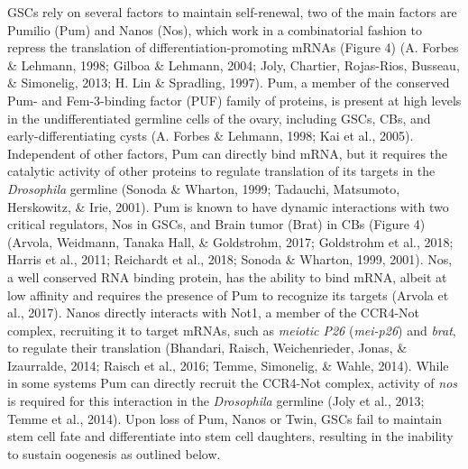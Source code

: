 \documentclass[12pt,oneside]{reedthesis}
\begin{document}
GSCs rely on several factors to maintain self-renewal, two of the main
factors are Pumilio (Pum) and Nanos (Nos), which work in a combinatorial
fashion to repress the translation of differentiation-promoting mRNAs
(Figure 4) (A. Forbes \& Lehmann, 1998; Gilboa \& Lehmann, 2004; Joly, Chartier, Rojas-Rios, Busseau, \& Simonelig, 2013; H. Lin \& Spradling, 1997).
Pum, a member of the conserved Pum- and Fem-3-binding factor (PUF)
family of proteins, is present at high levels in the undifferentiated
germline cells of the ovary, including GSCs, CBs, and
early-differentiating cysts (A. Forbes \& Lehmann, 1998; Kai et al., 2005). Independent of
other factors, Pum can directly bind mRNA, but it requires the catalytic
activity of other proteins to regulate translation of its targets in the
\emph{Drosophila} germline (Sonoda \& Wharton, 1999; Tadauchi, Matsumoto, Herskowitz, \& Irie, 2001). Pum is known
to have dynamic interactions with two critical regulators, Nos in GSCs,
and Brain tumor (Brat) in CBs (Figure 4) (Arvola, Weidmann, Tanaka Hall, \& Goldstrohm, 2017; Goldstrohm et al., 2018; Harris et al., 2011; Reichardt et al., 2018; Sonoda \& Wharton, 1999, 2001). Nos, a well conserved RNA binding protein, has the
ability to bind mRNA, albeit at low affinity and requires the presence
of Pum to recognize its targets (Arvola et al., 2017). Nanos directly
interacts with Not1, a member of the CCR4-Not complex, recruiting it to
target mRNAs, such as \emph{meiotic P26} (\emph{mei-p26}) and \emph{brat}, to regulate
their translation (Bhandari, Raisch, Weichenrieder, Jonas, \& Izaurralde, 2014; Raisch et al., 2016; Temme, Simonelig, \& Wahle, 2014).
While in some systems Pum can directly recruit the CCR4-Not complex,
activity of \emph{nos} is required for this interaction in the \emph{Drosophila}
germline (Joly et al., 2013; Temme et al., 2014). Upon loss of Pum, Nanos or Twin,
GSCs fail to maintain stem cell fate and differentiate into stem cell
daughters, resulting in the inability to sustain oogenesis as outlined
below.
\end{document}
